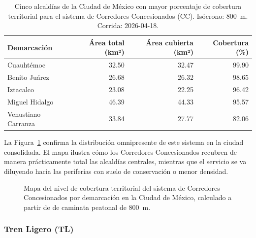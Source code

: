 \begin{table}[H]
    \centering
    \caption[Alcaldías con mayor cobertura de Corredores Concesionados (CDMX)]{
    Cinco alcaldías de la Ciudad de México con mayor porcentaje de cobertura
    territorial para el sistema de Corredores Concesionados (CC). Isócrono: 800~m.
    Corrida: 2026-04-18.}
    \label{tab:cobertura-cc-cdmx}
    \begin{tabular}{|l|r|r|r|}
        \hline
        \textbf{Demarcación} & \textbf{Área total (km²)} & \textbf{Área cubierta (km²)} & \textbf{Cobertura (\%)} \\
        \hline
        Cuauhtémoc          & 32.50 & 32.47 &  99.90 \\
        Benito Juárez       & 26.68 & 26.32 &  98.65 \\
        Iztacalco           & 23.08 & 22.25 &  96.42 \\
        Miguel Hidalgo      & 46.39 & 44.33 &  95.57 \\
        Venustiano Carranza & 33.84 & 27.77 &  82.06 \\
        \hline
    \end{tabular}
\end{table}

La Figura~\ref{fig:mapa-cobertura-cc} confirma la distribución omnipresente de
este sistema en la ciudad consolidada. El mapa ilustra cómo los Corredores
Concesionados recubren de manera prácticamente total las alcaldías centrales,
mientras que el servicio se va diluyendo hacia las periferias con suelo de
conservación o menor densidad.

\begin{figure}[H]
    \centering
    \caption[Mapa de cobertura territorial de Corredores Concesionados en la CDMX]{
    Mapa del nivel de cobertura territorial del sistema de Corredores
    Concesionados por demarcación en la Ciudad de México, calculado a partir de
     de caminata peatonal de 800~m.}
    \label{fig:mapa-cobertura-cc}
\end{figure}

\subsubsection{Tren Ligero (TL)}
\label{subsubsec:cobertura-tl}

